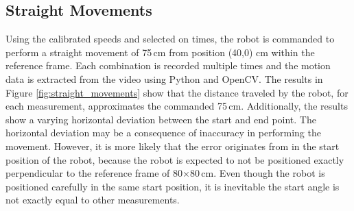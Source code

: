 \subsection{Straight Movements}
\label{eval:straight_movements}

Using the calibrated speeds and selected on times, the robot is commanded to perform a straight movement of 75\,cm from position (40,0) cm within the reference frame.
Each combination is recorded multiple times and the motion data is extracted from the video using Python and OpenCV.
The results in Figure \ref{fig:straight_movements} show that the distance traveled by the robot, for each measurement, approximates the commanded 75\,cm.
Additionally, the results show a varying horizontal deviation between the start and end point.
The horizontal deviation may be a consequence of inaccuracy in performing the movement.
However, it is more likely that the error originates from in the start position of the robot, because the robot is expected to not be positioned exactly perpendicular to the reference frame of 80$\times$80\,cm.
Even though the robot is positioned carefully in the same start position, it is inevitable the start angle is not exactly equal to other measurements.

